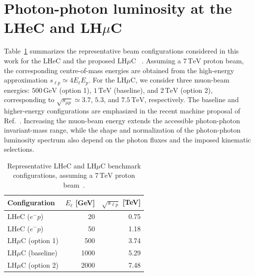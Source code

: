 \documentclass[11pt,a4paper]{article}
\newcommand{\TeV}{\,\mathrm{TeV}}
\newcommand{\GeV}{\,\mathrm{GeV}}
\begin{document}
\section{Photon-photon luminosity at the LHeC and LH$\mu$C}


Table~\ref{tab:machines} summarizes the representative
beam configurations considered in this work for the LHeC
and the proposed LH$\mu$C
~\cite{LHeC2025,Andre:2025iar,Piotrzkowski2026}.
Assuming a $7\TeV$ proton beam, the corresponding
centre-of-mass energies are obtained from the
high-energy approximation $s_{\ell p}\simeq 4E_\ell E_p$.
For the LH$\mu$C, we consider three muon-beam energies:
$500\GeV$ (option 1), $1\TeV$ (baseline), and
$2\TeV$ (option 2), corresponding to
$\sqrt{s_{\mu p}}\simeq 3.7$, $5.3$, and $7.5\TeV$,
respectively. The baseline and higher-energy configurations
are emphasized in the recent machine proposal
of Ref.~\cite{Piotrzkowski2026}.
Increasing the muon-beam energy extends the accessible
photon-photon invariant-mass range, while the shape
and normalization of the photon-photon luminosity
spectrum also depend on the photon fluxes and the
imposed kinematic selections.



\begin{table}[t]
\centering
\small
\caption{
Representative LHeC and LH$\mu$C benchmark configurations,
assuming a $7\TeV$ proton beam~\cite{LHeC2025,Piotrzkowski2026,Andre:2025iar}.}
\label{tab:machines}
\setlength{\tabcolsep}{7pt}
\renewcommand{\arraystretch}{1.12}
\begin{tabular}{@{}lrr@{}}
\toprule
Configuration
& $E_\ell$ [GeV]
& $\sqrt{s_{\ell p}}$ [TeV] \\
\midrule
LHeC ($e^-p$) & 20   & 0.75 \\
LHeC ($e^-p$) & 50   & 1.18 \\
LH$\mu$C (option 1)  & 500  & 3.74 \\
LH$\mu$C (baseline)  & 1000 & 5.29 \\
LH$\mu$C (option 2)  & 2000 & 7.48 \\
\bottomrule
\end{tabular}
\end{table}
\end{document}

